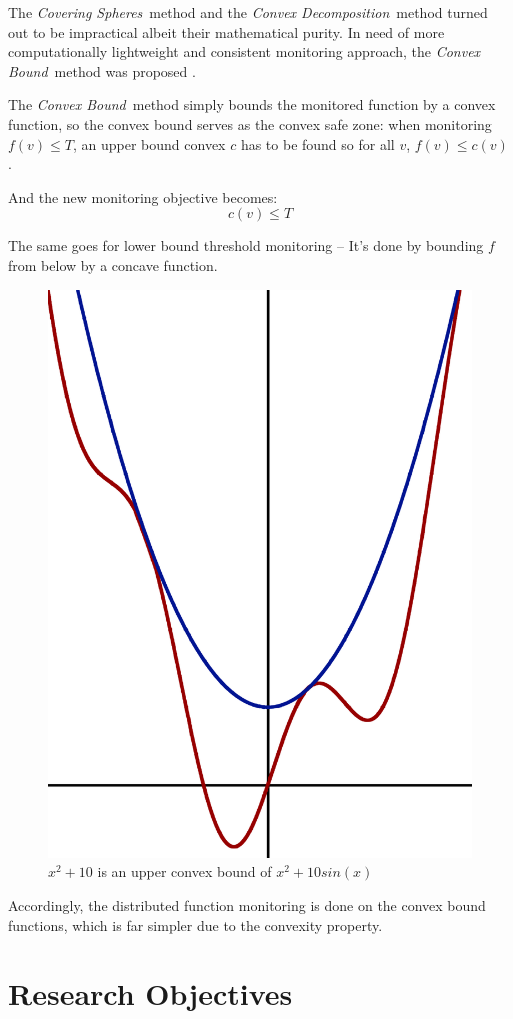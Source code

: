 \documentclass[11pt, conference]{article}
\newcommand{\coveringSpheres}{\textit{Covering Spheres}}
\newcommand{\convexDecomposition}{\textit{Convex Decomposition}}
\newcommand{\convexBound}{\textit{Convex Bound}}
\begin{document}
The \coveringSpheres \ method and the \convexDecomposition \ method turned out to be impractical albeit their mathematical purity. In need of more computationally lightweight and consistent monitoring approach, the \convexBound \ method was proposed \cite{lazerson2018lightweight}.

The \convexBound \ method simply bounds the monitored function by a convex function, so the convex bound serves as the convex safe zone: when monitoring $f(v) \leq T$, an upper bound convex $c$ has to be found so for all $v$, $f(v) \leq  c(v)$.

And the new monitoring objective becomes:
\begin{equation}
\label{monitoringConstraint}
c(v) \leq T
\end{equation}

The same goes for lower bound threshold monitoring -- It's done by bounding $f$ from below by a concave function.

\begin{figure}[t]
\begin{center}
\includegraphics[width=0.3\linewidth]{Pics/PNGs/ConvexBound.png}
\end{center}
\caption{$x^2+10$ is an upper convex bound of $x^2+10sin(x)$}
\end{figure}

Accordingly, the distributed function monitoring is done on the convex bound functions, which is far simpler due to the convexity property.

\section{Research Objectives}
\end{document}

